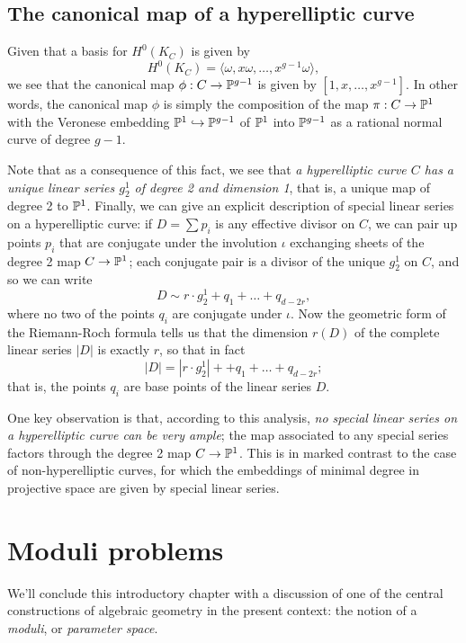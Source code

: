 \subsection{The canonical map of a hyperelliptic curve}

Given that a basis for $H^0(K_C)$ is given by 
$$
H^0(K_C) = \langle \omega, x\omega,\dots,x^{g-1}\omega \rangle,
$$
we see that the canonical map $\phi : C \to \PP^{g-1}$ is given by $[1,x,\dots,x^{g-1}]$. In other words, the canonical map $\phi$ is simply the composition of the map $\pi : C \to \PP^1$ with the Veronese embedding $\PP^1 \hookrightarrow \PP^{g-1}$ of $\PP^1$ into $\PP^{g-1}$ as a rational normal curve of degree $g-1$.

Note that as a consequence of this fact, we see that \emph{a hyperelliptic curve $C$ has a \emph{unique} linear series $g^1_2$ of degree 2 and dimension 1}, that is, a unique map of degree 2 to $\PP^1$. 
Finally, we can give an explicit description of special linear series on a hyperelliptic curve: if $D = \sum p_i$ is any effective divisor on $C$, we can pair up points $p_i$ that are conjugate under the involution $\iota$ exchanging sheets of the degree 2 map $C \to \PP^1$; each conjugate pair is a divisor of the unique $g^1_2$ on $C$, and so we can write
$$
D \sim r\cdot g^1_2 + q_1 + \dots + q_{d-2r},
$$
where no two of the points $q_i$ are conjugate under $\iota$. Now the geometric form of the Riemann-Roch formula tells us that the dimension $r(D)$ of the complete linear series $|D|$ is exactly $r$, so that in fact 
$$
|D| = |r\cdot g^1_2| + + q_1 + \dots + q_{d-2r};
$$
that is, the points $q_i$ are base points of the linear series $D$.

One key observation is that, according to this analysis, \emph{no special linear series on a hyperelliptic curve can be very ample}; the map associated to any special series factors through the degree 2 map $C \to \PP^1$. This is in marked contrast to the case of non-hyperelliptic curves, for which the embeddings of minimal degree in projective space are given by special linear series. 


\section{Moduli problems}

We'll conclude this introductory chapter with a discussion of one of the central constructions of algebraic geometry in the present context: the notion of a \emph{moduli}, or \emph{parameter space}.

